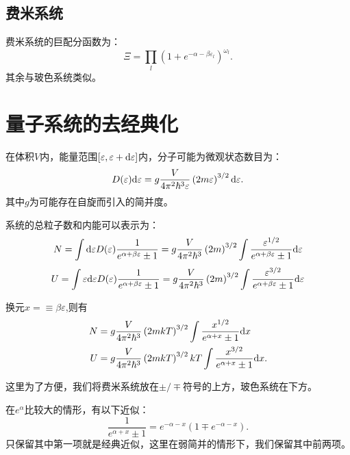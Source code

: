 \subsection{费米系统}
费米系统的巨配分函数为：
\begin{equation}
    \Xi=\prod_l\left(1+e^{-\alpha-\beta\varepsilon_l}\right)^{\omega_l}.
\end{equation}
其余与玻色系统类似。

\section{量子系统的去经典化}
在体积$V$内，能量范围$[\varepsilon,\varepsilon+\mathrm{d} \varepsilon]$内，分子可能为微观状态数目为：
\begin{equation}
D(\varepsilon)\mathrm{d} \varepsilon=g \frac{V}{4\pi^2\hbar^3\varepsilon}\left(2m\varepsilon\right)^{3/2}\mathrm{d}\varepsilon.    
\end{equation}
其中$g$为可能存在自旋而引入的简并度。

系统的总粒子数和内能可以表示为：
\begin{equation}
    N=\int \mathrm{d}\varepsilon D(\varepsilon) \frac{1}{e^{\alpha+\beta\varepsilon}\pm1}=g \frac{V}{4\pi^2\hbar^3}\left(2m\right)^{3/2}\int\frac{\varepsilon^{1/2}}{e^{\alpha+\beta\varepsilon}\pm1} \mathrm{d}\varepsilon
\end{equation}
\begin{equation}
    U=\int \varepsilon\mathrm{d}\varepsilon D(\varepsilon) \frac{1}{e^{\alpha+\beta\varepsilon}\pm1}=g \frac{V}{4\pi^2\hbar^3}\left(2m\right)^{3/2}\int \frac{\varepsilon^{3/2}}{e^{\alpha+\beta\varepsilon}\pm1} \mathrm{d}\varepsilon
\end{equation}

换元$x=\equiv \beta\varepsilon$,则有 
\begin{align}
    N&=g \frac{V}{4\pi^2\hbar^3}\left(2mkT\right)^{3/2}\int\frac{x^{1/2}}{e^{\alpha+x}\pm1} \mathrm{d} x\\
    U&=g \frac{V}{4\pi^2\hbar^3}\left(2mkT\right)^{3/2}kT\int\frac{x^{3/2}}{e^{\alpha+x}\pm1} \mathrm{d} x.
\end{align}

这里为了方便，我们将费米系统放在$\pm/\mp$符号的上方，玻色系统在下方。

在$e^{\alpha}$比较大的情形，有以下近似：
\begin{equation}
    \frac{1}{e^{\alpha+x}\pm1}=e^{-\alpha-x}(1\mp e^{-\alpha-x}).
\end{equation}
只保留其中第一项就是经典近似，这里在弱简并的情形下，我们保留其中前两项。

